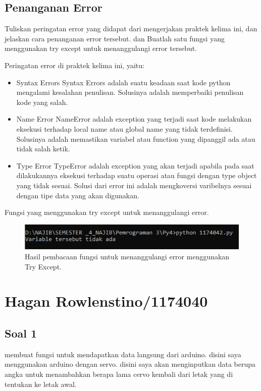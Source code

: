 \subsection{Penanganan Error}
Tuliskan  peringatan  error  yang  didapat  dari  mengerjakan  praktek  kelima  ini, dan  jelaskan  cara  penanganan  error  tersebut.   dan  Buatlah  satu  fungsi  yang menggunakan try except untuk menanggulangi error tersebut.

\hfill \break
Peringatan error di praktek kelima ini, yaitu:
\begin{itemize}
	\item Syntax Errors
	Syntax Errors adalah suatu keadaan saat kode python mengalami kesalahan penulisan. Solusinya adalah memperbaiki penulisan kode yang salah.
	
	\item Name Error
	NameError adalah exception yang terjadi saat kode melakukan eksekusi terhadap local name atau global name yang tidak terdefinisi. Solusinya adalah memastikan variabel atau function yang dipanggil ada atau tidak salah ketik.
	
	\item Type Error
	TypeError adalah exception yang akan terjadi apabila pada saat dilakukannya eksekusi terhadap suatu operasi atau fungsi dengan type object yang tidak sesuai. Solusi dari error ini adalah mengkoversi varibelnya sesuai dengan tipe data yang akan digunakan.
\end{itemize}

\hfill \break
Fungsi yang menggunakan try except untuk menanggulangi error.



\begin{figure}[H]
	\includegraphics[width=12cm]{figures/5/1174042/Praktek/5.png}
	\centering
	\caption{Hasil pembacaan fungsi untuk menanggulangi error menggunakan Try Except.}
\end{figure}

\section{Hagan Rowlenstino/1174040}
	\subsection{Soal 1} 
		membuat fungsi untuk mendapatkan data langsung dari arduino. disini saya menggunakan arduino dengan servo. disini saya akan menginputkan data berupa angka untuk menambahkan berapa lama cervo kembali dari letak yang di tentukan ke letak awal.

